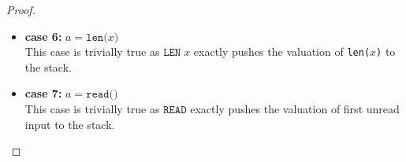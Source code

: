 \documentclass{article}
\begin{document}
\begin{proof}
\begin{itemize}
  Suppose $\mathit{LF}(lst; i_1, \dots, i_d)) = j$ for some $j \in \textbf{AExp}$ and assume for an induction on the correctness of the compilation of $j$. 

    \[
      \begin{aligned}
        \langle  \mathcal{CA}(a) : c,\, e,\, \sigma,\, s,\, pc \rangle 
        &= \langle \mathcal{CA}(lst\texttt{[$i_1$]}\dots\texttt{[$i_d$]}) : c,\, e,\, \sigma,\, s,\, pc \rangle \\
        &= \langle \mathcal{CA}(\mathit{LF}(lst; i_1, \dots, i_d)) : \texttt{LLOAD}\;lst : c,\, e,\, \sigma,\, s,\, pc \rangle 
        && \text{(definition of $\mathcal{CA}$)} \\
        &= \langle \mathcal{CA}(j) : \texttt{LLOAD}\;lst : c,\, e,\, \sigma,\, s,\, pc \rangle 
        && \text{(assumption)} \\
        &\triangleright^\ast \langle \texttt{LLOAD}\;lst : c,\, \mathcal{A}(j, \sigma, s):  e,\, \sigma,\, s,\, pc + l_j \rangle 
        && \text{(induction hypothesis)} \\
        &\triangleright \langle c,\, \sigma(lst\texttt{[$\mathcal{A}(j, \sigma, s)$]}, s):  e,\, \sigma,\, s,\, pc + l_j + 1 \rangle
        && \text{(operational semantics)} \\
        &= \langle c,\, \sigma(lst\texttt{[$\mathcal{A}(\mathit{LF}(lst\;; i_1, \dots, i_d), \sigma, s)$]}, s):  e,\, \sigma,\, s,\, pc + l_j + 1 \rangle
        && \text{(definition of $\mathit{LF}$)} \\
        &= \langle c,\, \mathcal{A}(lst\texttt{[$\mathcal{A}(i_1, \sigma, s)$]}\dots\texttt{[$\mathcal{A}(i_d, \sigma, s)$]}, \sigma, s) : e,\, \sigma,\, s,\, pc+1 \rangle 
        && \text{(list flattening)} \\
        &= \langle c,\, \mathcal{A}(lst\texttt{[$i_1$]}\dots\texttt{[$i_d$]}, \sigma, s) : e,\, \sigma,\, s,\, pc+1 \rangle
        && \text{(definition of $\mathcal{A}$)} \\
        &= \langle c,\, \mathcal{A}(a, \sigma, s) : e,\, \sigma,\, s,\, pc+1 \rangle \\
      \end{aligned}
  \]

    \item \textbf{case 6: } $a = \texttt{len($x$)}$ \\
    This case is trivially true as $\texttt{LEN}\;x$ exactly pushes the valuation of \texttt{len($x$)} to the stack.

    \item \textbf{case 7: } $a = \texttt{read()}$ \\
    This case is trivially true as $\texttt{READ}$ exactly pushes the valuation of first unread input to the stack.


\end{itemize}
\end{proof}
\end{document}
